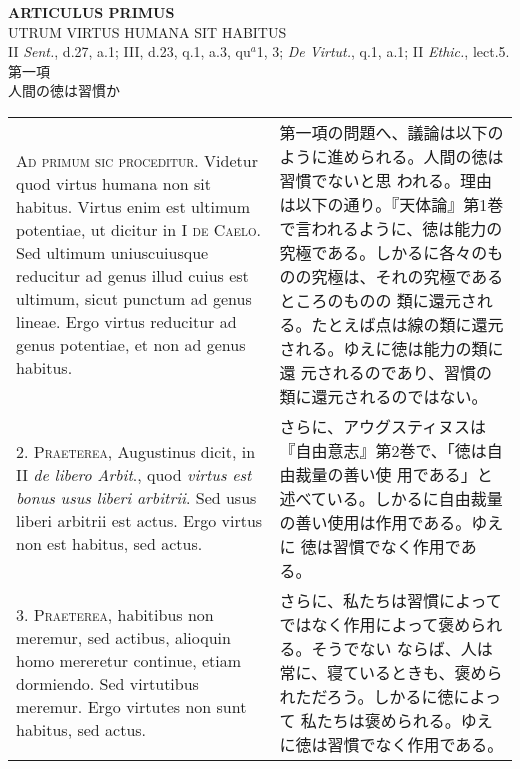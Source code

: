 \documentclass[10pt]{jsarticle}
\begin{document}
\newpage
{}
\begin{center}
{\Large {\bf ARTICULUS PRIMUS}}\\
{\large UTRUM VIRTUS HUMANA SIT HABITUS}\\
{\footnotesize II {\itshape Sent.}, d.27, a.1; III, d.23, q.1, a.3, qu$^{a}$1, 3; {\itshape De Virtut.}, q.1, a.1; II {\itshape Ethic.}, lect.5.}\\
{\Large 第一項\\人間の徳は習慣か}
\end{center}

\begin{longtable}{p{21em}p{21em}}

{\scshape Ad primum sic proceditur}. Videtur quod virtus humana non
sit habitus. Virtus enim est ultimum potentiae, ut dicitur in I
{\scshape de Caelo}. Sed ultimum uniuscuiusque reducitur ad genus
illud cuius est ultimum, sicut punctum ad genus lineae. Ergo virtus
reducitur ad genus potentiae, et non ad genus habitus.

&

第一項の問題へ、議論は以下のように進められる。人間の徳は習慣でないと思
われる。理由は以下の通り。『天体論』第1巻で言われるように、徳は能力の
究極である。しかるに各々のものの究極は、それの究極であるところのものの
類に還元される。たとえば点は線の類に還元される。ゆえに徳は能力の類に還
元されるのであり、習慣の類に還元されるのではない。


\\

2. {\scshape Praeterea}, Augustinus dicit, in II {\itshape de libero
Arbit}., quod {\itshape virtus est bonus usus liberi arbitrii}. Sed
usus liberi arbitrii est actus. Ergo virtus non est habitus, sed
actus.

&

さらに、アウグスティヌスは『自由意志』第2巻で、「徳は自由裁量の善い使
用である」と述べている。しかるに自由裁量の善い使用は作用である。ゆえに
徳は習慣でなく作用である。

\\



3. {\scshape Praeterea}, habitibus non meremur, sed actibus, alioquin
homo mereretur continue, etiam dormiendo. Sed virtutibus meremur. Ergo
virtutes non sunt habitus, sed actus.

&

さらに、私たちは習慣によってではなく作用によって褒められる。そうでない
ならば、人は常に、寝ているときも、褒められただろう。しかるに徳によって
私たちは褒められる。ゆえに徳は習慣でなく作用である。


\end{longtable}
\end{document}
